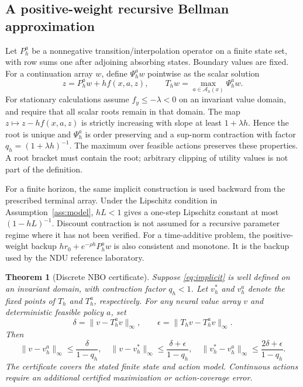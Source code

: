 \documentclass[ecta,draft]{econsocart}
\newtheorem{theorem}{Theorem}
\theoremstyle{definition}
\theoremstyle{remark}
\newcommand{\Act}{\mathcal A}
\begin{document}
\subsection{A positive-weight recursive Bellman approximation}
Let $P_h^a$ be a nonnegative transition/interpolation operator on a finite state set, with row sums one after adjoining absorbing states. Boundary values are fixed. For a continuation array $w$, define $\Psi_h^a w$ pointwise as the scalar solution
\begin{equation}\label{eq:implicit}
 z=P_h^a w+h f(x,a,z),\qquad
 T_h w=\max_{a\in\Act_h(x)}\Psi_h^a w.
\end{equation}
For stationary calculations assume $f_y\leq-\lambda<0$ on an invariant value domain, and require that all scalar roots remain in that domain. The map $z\mapsto z-hf(x,a,z)$ is strictly increasing with slope at least $1+\lambda h$. Hence the root is unique and $\Psi_h^a$ is order preserving and a sup-norm contraction with factor $q_h=(1+\lambda h)^{-1}$. The maximum over feasible actions preserves these properties. A root bracket must contain the root; arbitrary clipping of utility values is not part of the definition.

For a finite horizon, the same implicit construction is used backward from the prescribed terminal array. Under the Lipschitz condition in Assumption~\ref{ass:model}, $hL<1$ gives a one-step Lipschitz constant at most $(1-hL)^{-1}$. Discount contraction is not assumed for a recursive parameter regime where it has not been verified. For a time-additive problem, the positive-weight backup $hr_0+e^{-\rho h}P_h^a w$ is also consistent and monotone. It is the backup used by the NDU reference laboratory.

\begin{theorem}[Discrete NBO certificate]\label{thm:discrete}
Suppose \eqref{eq:implicit} is well defined on an invariant domain, with contraction factor $q_h<1$. Let $v_h^*$ and $v_h^a$ denote the fixed points of $T_h$ and $T_h^a$, respectively. For any neural value array $v$ and deterministic feasible policy $a$, set
\[
 \delta=\|v-T_h^av\|_\infty,\qquad
 \epsilon=\|T_hv-T_h^av\|_\infty.
\]
Then
\begin{equation}\label{eq:discretebound}
 \|v-v_h^a\|_\infty\leq\frac\delta{1-q_h},\quad
 \|v-v_h^*\|_\infty\leq\frac{\delta+\epsilon}{1-q_h},\quad
 \|v_h^*-v_h^a\|_\infty\leq\frac{2\delta+\epsilon}{1-q_h}.
\end{equation}
The certificate covers the stated finite state and action model. Continuous actions require an additional certified maximization or action-coverage error.
\end{theorem}
\end{document}
